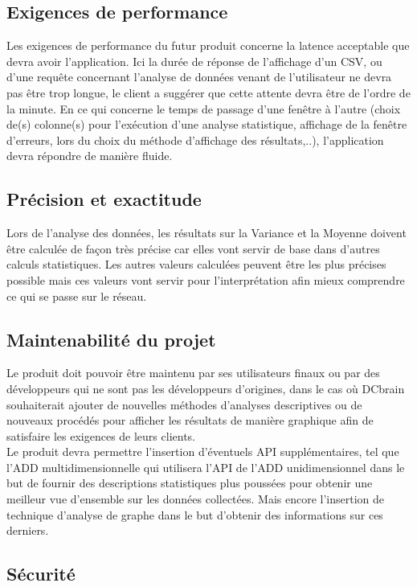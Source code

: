 		\subsection{Exigences de performance} 

		Les exigences de performance du futur produit concerne la latence acceptable que devra avoir l'application. Ici la durée de réponse de l’affichage d’un CSV, ou d’une requête concernant l’analyse de données venant de l’utilisateur ne devra pas être trop longue, le client a suggérer que cette attente devra être de l’ordre de la minute. En ce qui concerne le temps de passage d'une fenêtre à l'autre (choix de(s) colonne(s) pour l'exécution d'une analyse statistique, affichage de la fenêtre d'erreurs, lors du choix du méthode d’affichage des résultats,..), l’application devra répondre de manière fluide. 

		\subsection{Précision et exactitude}
			Lors de l'analyse des données, les résultats sur la Variance et la Moyenne doivent être calculée de façon très précise car elles vont servir de base dans d’autres calculs statistiques. Les autres valeurs calculées peuvent être les plus précises possible mais ces valeurs vont servir pour l'interprétation afin mieux comprendre ce qui se passe sur le réseau.

		\subsection{Maintenabilité du projet}
		Le produit doit pouvoir être maintenu par ses utilisateurs finaux ou par des développeurs qui ne sont pas les développeurs d’origines, dans le cas où DCbrain souhaiterait ajouter de nouvelles méthodes d’analyses descriptives ou de nouveaux procédés pour afficher les résultats de manière graphique afin de satisfaire les exigences de leurs clients.\\
		
		Le produit devra permettre l'insertion d'éventuels API supplémentaires, tel que l'ADD multidimensionnelle qui utilisera l'API de l'ADD unidimensionnel dans le but de fournir des descriptions statistiques plus poussées pour obtenir une meilleur vue d'ensemble sur les données collectées. Mais encore l'insertion de technique d'analyse de graphe dans le but d'obtenir des informations sur ces derniers.
		
		\subsection{Sécurité} 
